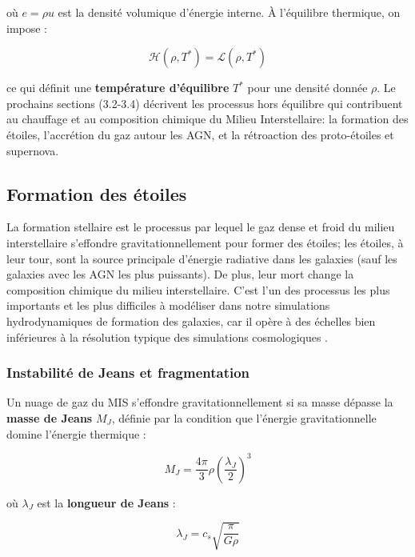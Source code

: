 \documentclass{article}
\begin{document}
\noindent où $e = \rho u$ est la densité volumique d'énergie interne.
À l'équilibre thermique, on impose :

\begin{equation}
    \mathcal{H}(\rho, T^*) = \mathcal{L}(\rho, T^*)
    \label{eq:equilibre_strict}
\end{equation}

\noindent ce qui définit une \textbf{température d'équilibre} $T^*$
pour une densité donnée $\rho$. Le prochains sections (3.2-3.4) décrivent les processus hors équilibre qui contribuent au chauffage et au composition chimique du Milieu Interstellaire: la formation des étoiles, l’accrétion du gaz autour les AGN, et la rétroaction des proto-étoiles et supernova.    


\subsection{Formation des étoiles}
La formation stellaire est le processus par lequel le gaz dense et froid du milieu interstellaire s'effondre gravitationnellement pour former des étoiles; les étoiles, à leur tour, sont la source principale d’énergie radiative dans les galaxies (sauf les galaxies avec les AGN les plus puissants). De plus, leur mort change la composition chimique du milieu interstellaire. C'est l'un des processus les plus importants et les plus difficiles à modéliser dans notre simulations hydrodynamiques de formation des galaxies, car il opère à des échelles bien inférieures à la résolution typique des simulations cosmologiques 
\cite{Katz1996}.

\subsubsection{Instabilité de Jeans et fragmentation}

Un nuage de gaz du MIS s'effondre gravitationnellement si sa masse
dépasse la \textbf{masse de Jeans} $M_J$, définie par la condition
que l'énergie gravitationnelle domine l'énergie thermique :

\begin{equation}
    M_J = \frac{4\pi}{3}\rho \left(\frac{\lambda_J}{2}\right)^3
    \label{eq:masse_jeans}
\end{equation}

\noindent où $\lambda_J$ est la \textbf{longueur de Jeans} :

\begin{equation}
    \lambda_J = c_s \sqrt{\frac{\pi}{G \rho}}
    \label{eq:longueur_jeans}
\end{equation}
\end{document}
